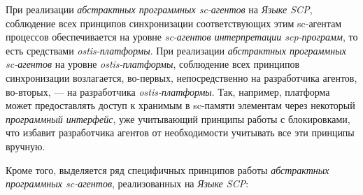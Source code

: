 При реализации \textit{абстрактных программных sc-агентов} на \textit{Языке SCP}, соблюдение всех принципов синхронизации соответствующих этим sc-агентам процессов обеспечивается на уровне \textit{sc-агентов интерпретации scp-программ}, то есть средствами \textit{ostis-платформы}. При реализации \textit{абстрактных программных sc-агентов} на уровне \textit{ostis-платформы}, соблюдение всех принципов синхронизации возлагается, во-первых, непосредственно на разработчика агентов, во-вторых, --- на разработчика \textit{ostis-платформы}. Так, например, платформа может предоставлять доступ к хранимым в sc-памяти элементам через некоторый \textit{программный интерфейс}, уже учитывающий принципы работы с блокировками, что избавит разработчика агентов от необходимости учитывать все эти принципы вручную.

Кроме того, выделяется ряд специфичных принципов работы \textit{абстрактных программных sc-агентов}, реализованных на \textit{Языке SCP}:
